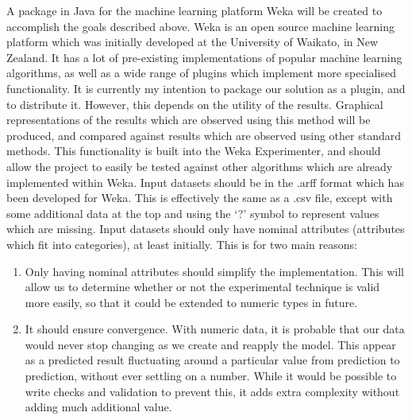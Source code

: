 A package in Java for the machine learning platform Weka will be created to accomplish the goals described above. Weka is an open source machine learning platform which was initially developed at the University of Waikato, in New Zealand. It has a lot of pre-existing implementations of popular machine learning algorithms, as well as a wide range of plugins which implement more specialised functionality. It is currently my intention to package our solution as a plugin, and to distribute it. However, this depends on the utility of the results.  Graphical representations of the results which are observed using this method will be produced, and compared against results which are observed using other standard methods.  This functionality is built into the Weka Experimenter, and should allow the project to easily be tested against other algorithms which are already implemented within Weka.  Input datasets should be in the .arff format which has been developed for Weka. This is effectively the same as a .csv file, except with some additional data at the top and using the ‘?’ symbol to represent values which are missing.  Input datasets should only have nominal attributes (attributes which fit into categories), at least initially. This is for two main reasons:
\begin{enumerate}
\item Only having nominal attributes should simplify the implementation. This will allow us to determine whether or not the experimental technique is valid more easily, so that it could be extended to numeric types in future. 
\item It should ensure convergence. With numeric data, it is probable that our data would never stop changing as we create and reapply the model. This appear as a predicted result fluctuating around a particular value from prediction to prediction, without ever settling on a number. While it would be possible to write checks and validation to prevent this, it adds extra complexity without adding much additional value.
 \end{enumerate}
